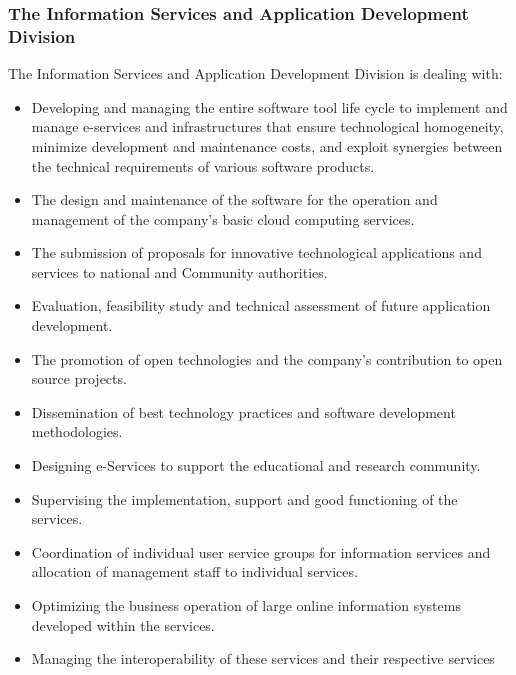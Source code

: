 \subsubsection{The Information Services and Application Development Division}
The Information Services and Application Development Division is dealing with:

\begin{itemize}
	
	\item Developing and managing the entire software tool life cycle to implement and manage e-services
	and infrastructures that ensure technological homogeneity, minimize development and maintenance costs,
	and exploit synergies between the technical requirements of various software products.
	
	\item The design and maintenance of the software for the operation and management of the company's basic cloud computing services.
	
	\item The submission of proposals for innovative technological applications and services to national and Community authorities.
	
	\item Evaluation, feasibility study and technical assessment of future application development.
	
	\item  The promotion of open technologies and the company's contribution to open source projects.
	
	\item Dissemination of best technology practices and software development methodologies.
	
	\item Designing e-Services to support the educational and research community.
	
	\item Supervising the implementation, support and good functioning of the services.
	
	\item Coordination of individual user service groups for information services and allocation of management staff to individual services.
	
	\item Optimizing the business operation of large online information systems developed within the services.
	
	\item Managing the interoperability of these services and their respective services
	

\end{itemize}
